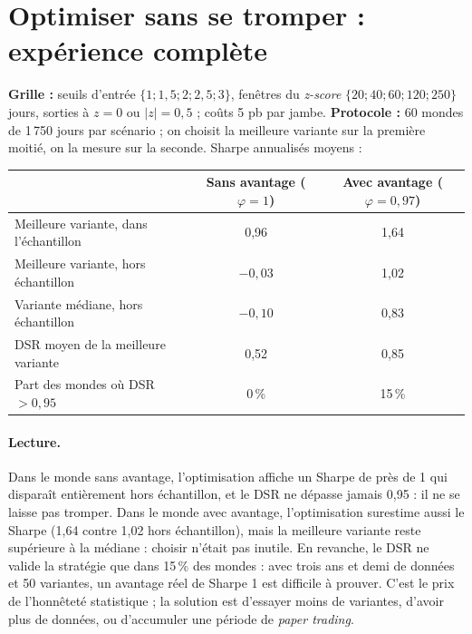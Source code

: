 \section{Optimiser sans se tromper : expérience complète}

\begin{codebox}
\textbf{Grille :} seuils d'entrée $\{1; 1{,}5; 2; 2{,}5; 3\}$, fenêtres du \emph{z-score} $\{20; 40; 60; 120; 250\}$ jours, sorties à $z=0$ ou $|z| = 0{,}5$ ; coûts 5 pb par jambe. \textbf{Protocole :} 60 mondes de 1\,750 jours par scénario ; on choisit la meilleure variante sur la première moitié, on la mesure sur la seconde. Sharpe annualisés moyens :
\begin{center}\small
\begin{tabular}{lcc}
\toprule
 & Sans avantage ($\varphi=1$) & Avec avantage ($\varphi=0{,}97$) \\
\midrule
Meilleure variante, dans l'échantillon & 0,96 & 1,64 \\
Meilleure variante, hors échantillon & $-0{,}03$ & 1,02 \\
Variante médiane, hors échantillon & $-0{,}10$ & 0,83 \\
DSR moyen de la meilleure variante & 0,52 & 0,85 \\
Part des mondes où DSR $>0{,}95$ & 0\,\% & 15\,\% \\
\bottomrule
\end{tabular}
\end{center}
\end{codebox}

\paragraph{Lecture.} Dans le monde sans avantage, l'optimisation affiche un Sharpe de près de 1 qui disparaît entièrement hors échantillon, et le DSR ne dépasse jamais 0,95 : il ne se laisse pas tromper. Dans le monde avec avantage, l'optimisation surestime aussi le Sharpe (1,64 contre 1,02 hors échantillon), mais la meilleure variante reste supérieure à la médiane : choisir n'était pas inutile. En revanche, le DSR ne valide la stratégie que dans 15\,\% des mondes : avec trois ans et demi de données et 50 variantes, un avantage réel de Sharpe 1 est difficile à prouver. C'est le prix de l'honnêteté statistique ; la solution est d'essayer moins de variantes, d'avoir plus de données, ou d'accumuler une période de \emph{paper trading}.

